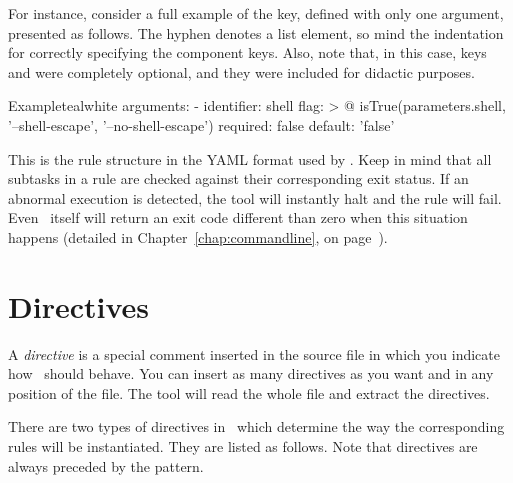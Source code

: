 \begin{description}
For instance, consider a full example of the  key, defined with only one argument, presented as follows. The hyphen denotes a list element, so mind the indentation for correctly specifying the component keys. Also, note that, in this case, keys  and  were completely optional, and they were included for didactic purposes.

\begin{codebox}{Example}{teal}{\icnote}{white}
arguments:
- identifier: shell
  flag: >
    @{
        isTrue(parameters.shell,
               '--shell-escape',
               '--no-shell-escape')
    }
  required: false
  default: 'false'
\end{codebox}
\end{description}

This is the rule structure in the YAML format used by \arara. Keep in mind that all subtasks in a rule are checked against their corresponding exit status. If an abnormal execution is detected, the tool will instantly halt and the rule will fail. Even \arara\ itself will return an exit code different than zero when this situation happens (detailed in Chapter~\ref{chap:commandline}, on page~\pageref{chap:commandline}).

\section{Directives}
\label{sec:directives}

A \emph{directive} is a special comment inserted in the source file in which you indicate how \arara\ should behave. You can insert as many directives as you want and in any position of the file. The tool will read the whole file and extract the directives.

There are two types of directives in \arara\ which determine the way the corresponding rules will be instantiated. They are listed as follows. Note that directives are always preceded by the  pattern.

